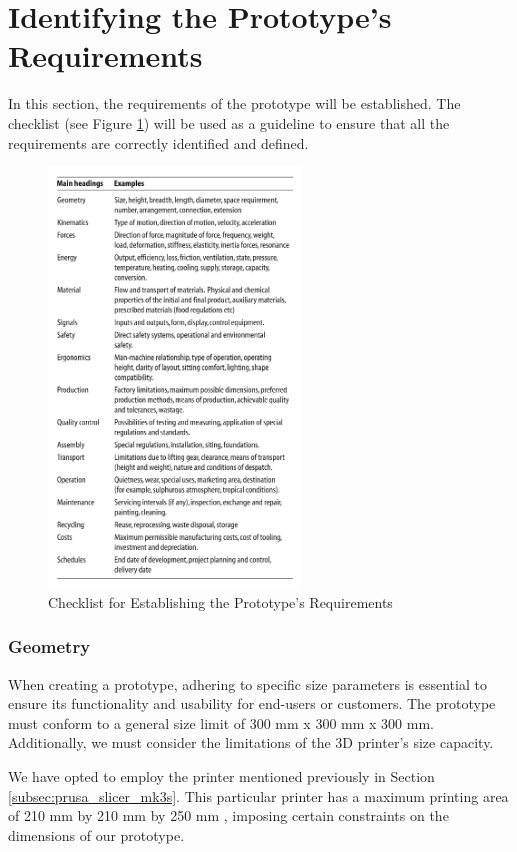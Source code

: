 \section{Identifying the Prototype's Requirements}
In this section, the requirements of the prototype will be established. The checklist (see Figure \ref{fig:checklist}) will be used as a guideline to ensure that all the requirements are correctly identified and defined.

\begin{figure}[ht!]
    \centering
    \includegraphics[width=0.6\textwidth]{texs/Part1/chapter2/image/requirements.png}
    \caption{Checklist for Establishing the Prototype's Requirements \cite{Pahl07o}}
    \label{fig:checklist}
\end{figure}

\subsubsection{Geometry}
When creating a prototype, adhering to specific size parameters is essential to ensure its functionality and usability for end-users or customers. The prototype must conform to a general size limit of 300 mm x 300 mm x 300 mm. Additionally, we must consider the limitations of the 3D printer's size capacity.

We have opted to employ the printer mentioned previously in Section \ref{subsec:prusa_slicer_mk3s}. This particular printer has a maximum printing area of 210 mm by 210 mm by 250 mm \cite{Prusa}, imposing certain constraints on the dimensions of our prototype.


